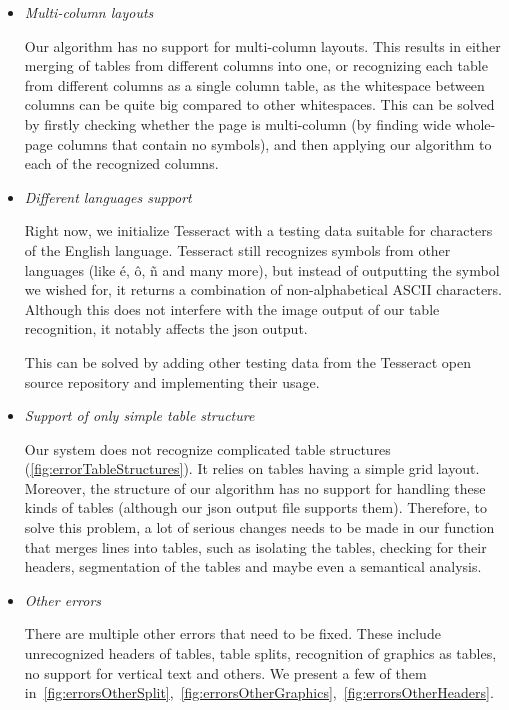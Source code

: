 \begin{itemize}
    \item \emph{Multi-column layouts}
    
    Our algorithm has no support for multi-column layouts. This results in either merging of tables from different columns into one, or recognizing each table from different columns as a single column table, as the whitespace between columns can be quite big compared to other whitespaces. This can be solved by firstly checking whether the page is multi-column (by finding wide whole-page columns that contain no symbols), and then applying our algorithm to each of the recognized columns.
    
    \item \emph{Different languages support}
    
    Right now, we initialize Tesseract with a testing data suitable for characters of the English language. Tesseract still recognizes symbols from other languages (like é, ô, ñ and many more), but instead of outputting the symbol we wished for, it returns a combination of non-alphabetical ASCII characters. Although this does not interfere with the image output of our table recognition, it notably affects the json output.
    
    This can be solved by adding other testing data from the Tesseract open source repository and implementing their usage.
    
    \item \emph{Support of only simple table structure}
    
    Our system does not recognize complicated table structures (\cref{fig:errorTableStructures}). It relies on tables having a simple grid layout. Moreover, the structure of our algorithm has no support for handling these kinds of tables (although our json output file supports them). Therefore, to solve this problem, a lot of serious changes needs to be made in our function that merges lines into tables, such as isolating the tables, checking for their headers, segmentation of the tables and maybe even a semantical analysis.  
    
    \item \emph{Other errors}
    
    There are multiple other errors that need to be fixed. These include unrecognized headers of tables, table splits, recognition of graphics as tables, no support for vertical text and others. We present a few of them in~\cref{fig:errorsOtherSplit},~\cref{fig:errorsOtherGraphics},~\cref{fig:errorsOtherHeaders}.
    
\end{itemize}

